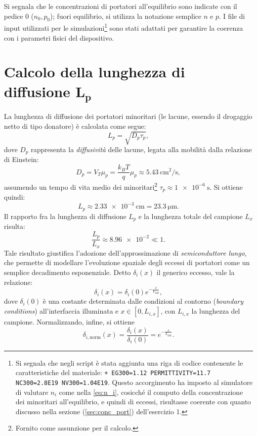 \documentclass[a4paper,11pt]{report}
\begin{document}
Si segnala che le concentrazioni di portatori all'equilibrio sono indicate con il pedice $0$ ($n_0, p_0$); fuori equilibrio, si utilizza la notazione semplice $n$ e $p$. I file di input utilizzati per le simulazioni\footnote{Si segnala che negli script è stata aggiunta una riga di codice contenente le caratteristiche del materiale: \texttt{+	EG300=1.12 PERMITTIVITY=11.7 NC300=2.8E19 NV300=1.04E19}. Questo accorgimento ha imposto al simulatore di valutare $n_i$ come nella \eqref{eq:n_i}, cosicché il computo della concentrazione dei minoritari all'equilibrio, e quindi di eccessi, risultasse coerente con quanto discusso nella sezione (\ref{sec:conc_port}) dell'esercizio 1.} sono stati adattati per garantire la coerenza con i parametri fisici del dispositivo.

\section[Calcolo della lunghezza di diffusione $L_p$]{Calcolo della lunghezza di diffusione \texorpdfstring{$\bm{L_p}$}{Lp}}
La lunghezza di diffusione dei portatori minoritari (le lacune, essendo il drogaggio netto di tipo donatore) è calcolata come segue:
\begin{equation}
L_p = \sqrt{D_p \tau_p},
\end{equation} 
dove $D_p$ rappresenta la \textit{diffusività} delle lacune, legata alla mobilità dalla relazione di Einstein:
\[
D_p = V_T \mu_p = \frac{k_B T}{q}\mu_p \approx \SI{5.43}{\centi\meter\squared\per\second},
\]
assumendo un tempo di vita medio dei minoritari\footnote{Fornito come assunzione per il calcolo.} $\tau_p \approx \SI{1e-6}{\second}$. Si ottiene quindi:
\begin{equation}
L_p \approx \SI{2.33e-3}{\centi\meter} = \SI{23.3}{\micro\meter}.
\label{eq:L_p}
\end{equation} 
Il rapporto fra la lunghezza di diffusione $L_p$ e la lunghezza totale del campione $L_x$ risulta:
\begin{equation}
\frac{L_p}{L_x} \approx \num{8.96e-2} \ll 1.
\end{equation}
Tale risultato giustifica l'adozione dell'approssimazione di \textit{semiconduttore lungo}, che permette di modellare l'evoluzione spaziale degli eccessi di portatori come un semplice decadimento esponenziale. Detto $\delta_i(x)$ il generico eccesso, vale la relazione:
\begin{equation}
\delta_i(x) = \delta_i(0) e^{-\frac{x}{L_{\text{diff}}}},
\end{equation} 
dove $\delta_i(0)$ è una costante determinata dalle condizioni al contorno (\textit{boundary conditions}) all'interfaccia illuminata e $x \in [0,L_{i,x}]$, con $L_{i,x}$ la lunghezza del campione. Normalizzando, infine, si ottiene
\begin{equation}
\delta_{i,\text{norm}}(x) = \frac{\delta_i(x)}{\delta_i(0)} = e^{-\frac{x}{L_{\text{diff}}}}.
\label{eq:semic_lungo_norm}
\end{equation} 
\end{document}
